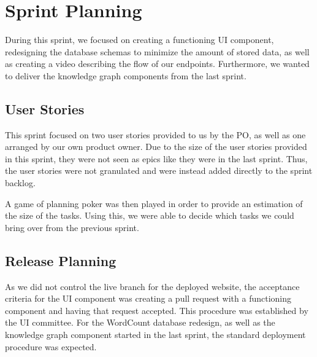 \section{Sprint Planning}
During this sprint, we focused on creating a functioning UI component, redesigning the database schemas to minimize the amount of stored data, as well as creating a video describing the flow of our endpoints. Furthermore, we wanted to deliver the knowledge graph components from the last sprint. 

\subsection*{User Stories}
This sprint focused on two user stories provided to us by the \knox{} PO, as well as one arranged by our own product owner. 
Due to the size of the user stories provided in this sprint, they were not seen as epics like they were in the last sprint. Thus, the user stories were not granulated and were instead added directly to the sprint backlog.  


A game of planning poker was then played in order to provide an estimation of the size of the tasks. 
Using this, we were able to decide which tasks we could bring over from the previous sprint.

\subsection*{Release Planning}
As we did not control the live branch for the deployed \knox{} website, the acceptance criteria for the UI component was creating a pull request with a functioning component and having that request accepted.
This procedure was established by the UI committee. 
For the WordCount database redesign, as well as the knowledge graph component started in the last sprint, the standard deployment procedure was expected. 